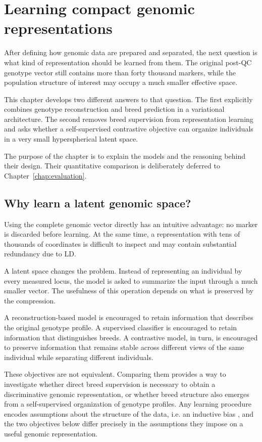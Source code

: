 \chapter{Learning compact genomic representations}
\label{chap:representations}
\label{chap:latent_representations}

After defining how genomic data are prepared and separated, the next
question is what kind of representation should be learned from them.
The original post-QC genotype vector still contains more than forty
thousand markers, while the population structure of interest may
occupy a much smaller effective space.

This chapter develops two different answers to that question. The
first explicitly combines genotype reconstruction and breed prediction
in a variational architecture. The second removes breed supervision
from representation learning and asks whether a self-supervised
contrastive objective can organize individuals in a very small
hyperspherical latent space.

The purpose of the chapter is to explain the models and the reasoning
behind their design. Their quantitative comparison is deliberately
deferred to Chapter~\ref{chap:evaluation}.

\section{Why learn a latent genomic space?}
\label{sec:why_latent_genomics}

Using the complete genomic vector directly has an intuitive advantage:
no marker is discarded before learning. At the same time, a
representation with tens of thousands of coordinates is difficult to
inspect and may contain substantial redundancy due to LD.

A latent space changes the problem. Instead of representing an
individual by every measured locus, the model is asked to summarize
the input through a much smaller vector. The usefulness of this
operation depends on what is preserved by the compression.

A reconstruction-based model is encouraged to retain information that
describes the original genotype profile. A supervised classifier is
encouraged to retain information that distinguishes breeds. A
contrastive model, in turn, is encouraged to preserve information that
remains stable across different views of the same individual while
separating different individuals.

These objectives are not equivalent. Comparing them provides a way to
investigate whether direct breed supervision is necessary to obtain a
discriminative genomic representation, or whether breed structure also
emerges from a self-supervised organization of genotype profiles. Any
learning procedure encodes assumptions about the structure of the data,
i.e. an inductive bias \cite{mitchell1980need}, and the two objectives
below differ precisely in the assumptions they impose on a useful
genomic representation.

